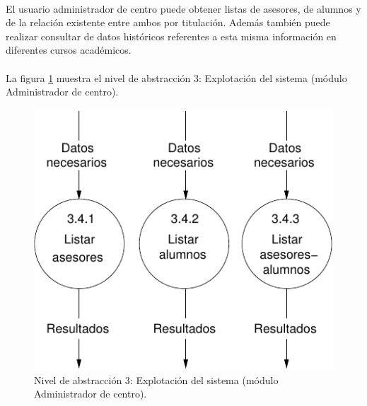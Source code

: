 \paragraph{}El usuario administrador de centro puede obtener listas de asesores,
de alumnos y de la relación existente entre ambos por titulación. Además también
puede realizar consultar de datos históricos referentes a esta misma información
en diferentes cursos académicos.

\paragraph{}La figura \ref{diagramaNivel3-ExplotacionSistema-adminCentro}
muestra el nivel de abstracción 3: Explotación del sistema (módulo Administrador
de centro).

  \begin{figure}[!ht]
    \begin{center}
      \includegraphics[]{08.Analisis_Funcional/8.2.DFDs/Niveles/Nivel3/AdministradorCentro/ExplotacionSistema/Diagramas/nivel3-ExplotacionSistema.pdf}
      \caption{Nivel de abstracción 3: Explotación del sistema (módulo
      Administrador de centro).}
      \label{diagramaNivel3-ExplotacionSistema-adminCentro}
    \end{center}
  \end{figure}
